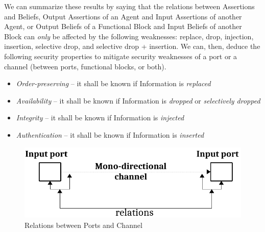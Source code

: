 \documentclass[conference]{IEEEtran}
\begin{document}
We can summarize these results by saying that the relations between Assertions
and Beliefs, Output Assertions of an Agent and Input Assertions of another
Agent, or Output Beliefs of a Functional Block and Input Beliefs of another
Block can \emph{only} be affected by the following weaknesses: replace, drop,
injection, insertion, selective drop, and selective drop + insertion.  We can,
then, deduce the following security properties to mitigate security weaknesses
of a port or a channel (between ports, functional blocks, or both).
\begin{itemize}
	\item \emph{Order-preserving} -- it shall be known if Information is \emph{replaced}
	\item \emph{Availability} -- it shall be known if Information is \emph{dropped} or \emph{selectively dropped}
	\item \emph{Integrity} -- it shall be known if Information is \emph{injected}
	\item \emph{Authentication} -- it shall be known if Information is \emph{inserted}
\end{itemize}


\begin{figure}[t]
	\centering
	\includegraphics[width=.9\columnwidth]{engineering_relations.pdf}
	\caption{Relations between Ports and Channel}
	\label{fig:atom}
\end{figure}
\end{document}
